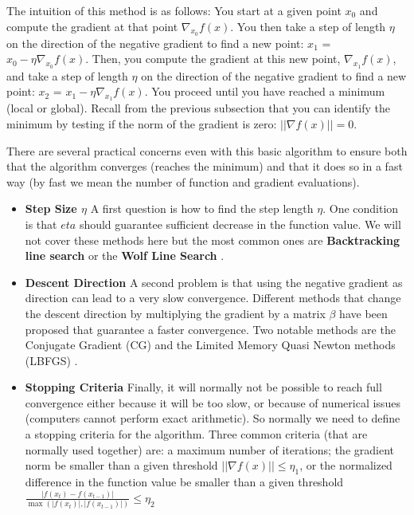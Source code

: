 The intuition of this method is as follows: You start at a given point
$x_0$ and compute the gradient at that point $\nabla_{x_0} f(x)$. You
then take a step of length $\eta$ on the direction of the negative
gradient to find a new point: $x_1$ = $x_0 - \eta \nabla_{x_{0}}
f(x)$. Then, you compute the gradient at this new point, $\nabla_{x_1} f(x)$, and take a step of length $\eta$ on the direction of the negative
gradient to find a new point: $x_2$ = $x_1 - \eta \nabla_{x_{1}} f(x)$. You proceed until you have reached a minimum (local or global). Recall from the previous subsection that you can identify the minimum by testing if the norm of the gradient is zero: $||\nabla f(x)|| = 0$.

There are several practical concerns even with this basic algorithm to ensure both that the algorithm converges (reaches the minimum) and that it does so in a fast way (by fast we mean the number of function and gradient evaluations). 
\begin{itemize}
\item \textbf{Step Size $\eta$} A first question is how to find the step length $\eta$. One condition is that $eta$ should guarantee sufficient decrease in the function value. We will not cover these methods here but the most common ones are \textbf{Backtracking line search} or the \textbf{Wolf Line Search} \citep{Nocedal1999}.
\item \textbf{Descent Direction}  A second problem is that using the negative gradient as direction can lead to a very slow convergence. Different methods that change the descent direction by multiplying the gradient by a matrix $\beta$ have been proposed that guarantee a faster convergence. Two notable methods are the Conjugate Gradient (CG) and the Limited Memory Quasi Newton methods (LBFGS) \citep{Nocedal1999}. 
\item \textbf{Stopping Criteria} Finally, it will normally not be possible to reach full convergence either because it will be too slow, or because of numerical issues (computers cannot perform exact arithmetic). So normally we need to define a stopping criteria for the algorithm. Three common criteria (that are normally used together) are: a maximum number of iterations; the gradient norm be smaller than a given threshold   $||\nabla f(x)|| \leq \eta_1$, or the normalized difference in the function value be smaller than a given threshold $\frac{|f(x_t) - f(x_{t-1})|}{\max(|f(x_t)|,|f(x_{t-1})|)} \leq \eta_2$
\end{itemize}

